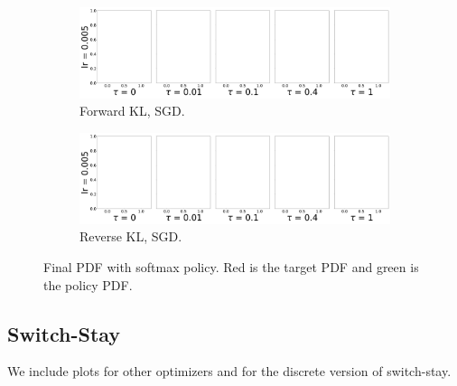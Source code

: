 \documentclass{article}
\begin{document}
\begin{figure}[!ht]
  \begin{subfigure}[b]{0.4\linewidth}
    \centering
    \includegraphics[width=1\columnwidth]{figs/discrete-bandit/notlearnQ/sgd/pdf_forward_optim=sgd.png}
    \caption{Forward KL, SGD.}
    \label{fig:discrete-bandit-pdf-forward-sgd}
  \end{subfigure}%
  \begin{subfigure}[b]{0.4\linewidth}
    \centering
    \includegraphics[width=1\columnwidth]{figs/discrete-bandit/notlearnQ/sgd/pdf_reverse_optim=sgd.png}
    \caption{Reverse KL, SGD.}
    \label{fig:discrete-bandit-pdf-reverse-sgd}
  \end{subfigure}
  \caption{Final PDF with softmax policy. Red is the target PDF and green is the policy PDF. }
\end{figure}


\clearpage

\subsection{Switch-Stay}\label{sec:switch-stay}
We include plots for other optimizers and for the discrete version of switch-stay. 
\end{document}
